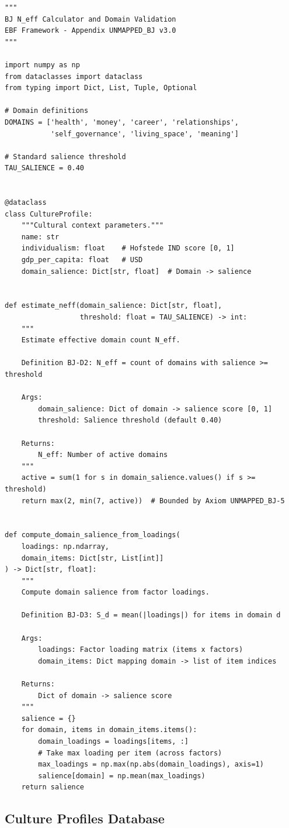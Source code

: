 \begin{verbatim}
"""
BJ N_eff Calculator and Domain Validation
EBF Framework - Appendix UNMAPPED_BJ v3.0
"""

import numpy as np
from dataclasses import dataclass
from typing import Dict, List, Tuple, Optional

# Domain definitions
DOMAINS = ['health', 'money', 'career', 'relationships',
           'self_governance', 'living_space', 'meaning']

# Standard salience threshold
TAU_SALIENCE = 0.40


@dataclass
class CultureProfile:
    """Cultural context parameters."""
    name: str
    individualism: float    # Hofstede IND score [0, 1]
    gdp_per_capita: float   # USD
    domain_salience: Dict[str, float]  # Domain -> salience


def estimate_neff(domain_salience: Dict[str, float],
                  threshold: float = TAU_SALIENCE) -> int:
    """
    Estimate effective domain count N_eff.

    Definition BJ-D2: N_eff = count of domains with salience >= threshold

    Args:
        domain_salience: Dict of domain -> salience score [0, 1]
        threshold: Salience threshold (default 0.40)

    Returns:
        N_eff: Number of active domains
    """
    active = sum(1 for s in domain_salience.values() if s >= threshold)
    return max(2, min(7, active))  # Bounded by Axiom UNMAPPED_BJ-5


def compute_domain_salience_from_loadings(
    loadings: np.ndarray,
    domain_items: Dict[str, List[int]]
) -> Dict[str, float]:
    """
    Compute domain salience from factor loadings.

    Definition BJ-D3: S_d = mean(|loadings|) for items in domain d

    Args:
        loadings: Factor loading matrix (items x factors)
        domain_items: Dict mapping domain -> list of item indices

    Returns:
        Dict of domain -> salience score
    """
    salience = {}
    for domain, items in domain_items.items():
        domain_loadings = loadings[items, :]
        # Take max loading per item (across factors)
        max_loadings = np.max(np.abs(domain_loadings), axis=1)
        salience[domain] = np.mean(max_loadings)
    return salience
\end{verbatim}

\subsection{Culture Profiles Database}

